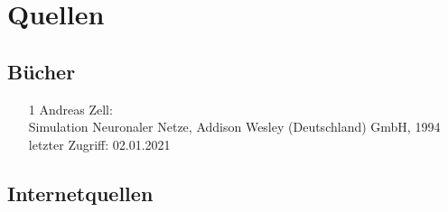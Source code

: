 \documentclass[11pt, a4paper, ngerman]{article}
\begin{document}
\newpage
\section{Quellen}

\subsection{Bücher}
\begin{itemize}
	\item [1] \label{src:1} Andreas Zell:\\[0.25ex]
	Simulation Neuronaler Netze, Addison Wesley (Deutschland) GmbH, 1994\\
	letzter Zugriff: 02.01.2021
\end{itemize}

\subsection{Internetquellen}
\end{document}
